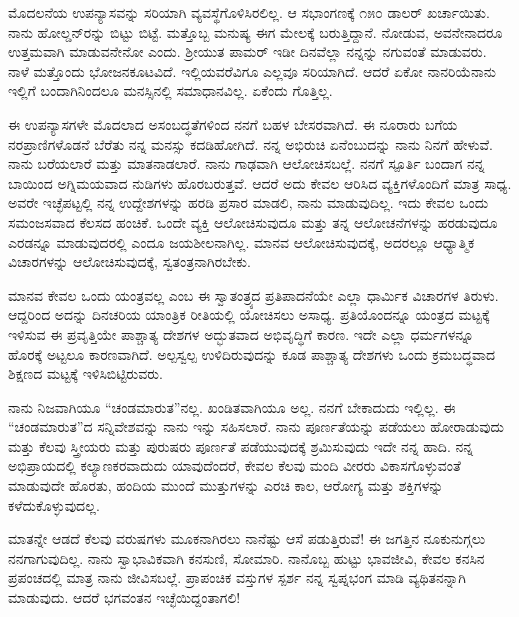ಮೊದಲನೆಯ ಉಪನ್ಯಾಸವನ್ನು ಸರಿಯಾಗಿ ವ್ಯವಸ್ಥೆಗೊಳಿಸಿರಲಿಲ್ಲ. ಆ ಸಭಾಂಗಣಕ್ಕೆ ೧೫೦ ಡಾಲರ್ ಖರ್ಚಾಯಿತು. ನಾನು ಹೋಲ್ಡನ್‌ರನ್ನು ಬಿಟ್ಟು ಬಿಟ್ಟೆ. ಮತ್ತೊಬ್ಬ ಮನುಷ್ಯ ಈಗ ಮೇಲಕ್ಕೆ ಬರುತ್ತಿದ್ದಾನೆ. ನೋಡುವ, ಅವನೇನಾದರೂ ಉತ್ತಮವಾಗಿ ಮಾಡುವನೇನೋ ಎಂದು. ಶ‍್ರೀಯುತ ಪಾಮರ್ ಇಡೀ ದಿನವೆಲ್ಲಾ ನನ್ನನ್ನು ನಗುವಂತೆ ಮಾಡುವರು. ನಾಳೆ ಮತ್ತೊಂದು ಭೋಜನಕೂಟವಿದೆ. ಇಲ್ಲಿಯವರೆವಿಗೂ ಎಲ್ಲವೂ ಸರಿಯಾಗಿದೆ. ಆದರೆ ಏಕೋ ನಾನರಿಯೆ\enginline{-}ನಾನು ಇಲ್ಲಿಗೆ ಬಂದಾಗಿನಿಂದಲೂ ಮನಸ್ಸಿನಲ್ಲಿ ಸಮಾಧಾನವಿಲ್ಲ. ಏಕೆಂದು ಗೊತ್ತಿಲ್ಲ.

ಈ ಉಪನ್ಯಾಸಗಳೇ ಮೊದಲಾದ ಅಸಂಬದ್ಧತೆಗಳಿಂದ ನನಗೆ ಬಹಳ ಬೇಸರವಾಗಿದೆ. ಈ ನೂರಾರು ಬಗೆಯ ನರಪ್ರಾಣಿಗಳೊಡನೆ ಬೆರೆತು ನನ್ನ ಮನಸ್ಸು ಕದಡಿಹೋಗಿದೆ. ನನ್ನ ಅಭಿರುಚಿ ಏನೆಂಬುದನ್ನು ನಾನು ನಿನಗೆ ಹೇಳುವೆ. ನಾನು ಬರೆಯಲಾರೆ ಮತ್ತು ಮಾತನಾಡಲಾರೆ. ನಾನು ಗಾಢವಾಗಿ ಆಲೋಚಿಸಬಲ್ಲೆ. ನನಗೆ ಸ್ಪೂರ್ತಿ ಬಂದಾಗ ನನ್ನ ಬಾಯಿಂದ ಅಗ್ನಿಮಯವಾದ ನುಡಿಗಳು ಹೊರಬರುತ್ತವೆ. ಆದರೆ ಅದು ಕೇವಲ ಆರಿಸಿದ ವ್ಯಕ್ತಿಗಳೊಂದಿಗೆ ಮಾತ್ರ ಸಾಧ್ಯ. ಅವರೇ ಇಚ್ಛೆಪಟ್ಟಲ್ಲಿ ನನ್ನ ಉದ್ದೇಶಗಳನ್ನು ಹರಡಿ ಪ್ರಸಾರ ಮಾಡಲಿ, ನಾನು ಮಾಡುವುದಿಲ್ಲ. ಇದು ಕೇವಲ ಒಂದು ಸಮಂಜಸವಾದ ಕೆಲಸದ ಹಂಚಿಕೆ. ಒಂದೇ ವ್ಯಕ್ತಿ ಆಲೋಚಿಸುವುದೂ ಮತ್ತು ತನ್ನ ಆಲೋಚನೆಗಳನ್ನು ಹರಡುವುದೂ ಎರಡನ್ನೂ ಮಾಡುವುದರಲ್ಲಿ ಎಂದೂ ಜಯಶೀಲನಾಗಿಲ್ಲ. ಮಾನವ ಆಲೋಚಿಸುವುದಕ್ಕೆ, ಅದರಲ್ಲೂ ಆಧ್ಯಾತ್ಮಿಕ ವಿಚಾರಗಳನ್ನು ಆಲೋಚಿಸುವುದಕ್ಕೆ, ಸ್ವತಂತ್ರನಾಗಿರಬೇಕು.

\vspace{0.1cm}

ಮಾನವ ಕೇವಲ ಒಂದು ಯಂತ್ರವಲ್ಲ ಎಂಬ ಈ ಸ್ವಾತಂತ್ರ್ಯದ ಪ್ರತಿಪಾದನೆಯೇ ಎಲ್ಲಾ ಧಾರ್ಮಿಕ ವಿಚಾರಗಳ ತಿರುಳು. ಆದ್ದರಿಂದ ಅದನ್ನು ದಿನಚರಿಯ ಯಾಂತ್ರಿಕ ರೀತಿಯಲ್ಲಿ ಯೋಚಿಸಲು ಅಸಾಧ್ಯ. ಪ್ರತಿಯೊಂದನ್ನೂ ಯಂತ್ರದ ಮಟ್ಟಕ್ಕೆ ಇಳಿಸುವ ಈ ಪ್ರವೃತ್ತಿಯೇ ಪಾಶ್ಚಾತ್ಯ ದೇಶಗಳ ಅದ್ಭುತವಾದ ಅಭಿವೃದ್ಧಿಗೆ ಕಾರಣ. ಇದೇ ಎಲ್ಲಾ ಧರ್ಮಗಳನ್ನೂ ಹೊರಕ್ಕೆ ಅಟ್ಟಲೂ ಕಾರಣವಾಗಿದೆ. ಅಲ್ಪಸ್ವಲ್ಪ ಉಳಿದಿರುವುದನ್ನು ಕೂಡ ಪಾಶ್ಚಾತ್ಯ ದೇಶಗಳು ಒಂದು ಕ್ರಮಬದ್ಧವಾದ ಶಿಕ್ಷಣದ ಮಟ್ಟಕ್ಕೆ ಇಳಿಸಿಬಿಟ್ಟಿರುವರು.

ನಾನು ನಿಜವಾಗಿಯೂ “ಚಂಡಮಾರುತ”ನಲ್ಲ. ಖಂಡಿತವಾಗಿಯೂ ಅಲ್ಲ. ನನಗೆ ಬೇಕಾದುದು ಇಲ್ಲಿಲ್ಲ. ಈ “ಚಂಡಮಾರುತ”ದ ಸನ್ನಿವೇಶವನ್ನು ನಾನು ಇನ್ನು ಸಹಿಸಲಾರೆ. ನಾನು ಪೂರ್ಣತೆಯನ್ನು ಪಡೆಯಲು ಹೋರಾಡುವುದು ಮತ್ತು ಕೆಲವು ಸ್ತ್ರೀಯರು ಮತ್ತು ಪುರುಷರು ಪೂರ್ಣತೆ ಪಡೆಯುವುದಕ್ಕೆ ಶ್ರಮಿಸುವುದು \enginline{-} ಇದೇ ನನ್ನ ಹಾದಿ. ನನ್ನ ಅಭಿಪ್ರಾಯದಲ್ಲಿ ಕಲ್ಯಾಣಕರವಾದುದು ಯಾವುದೆಂದರೆ, ಕೇವಲ ಕೆಲವು ಮಂದಿ ವೀರರು ವಿಕಾಸಗೊಳ್ಳುವಂತೆ ಮಾಡುವುದೇ ಹೊರತು, ಹಂದಿಯ ಮುಂದೆ ಮುತ್ತುಗಳನ್ನು ಎರಚಿ ಕಾಲ, ಆರೋಗ್ಯ ಮತ್ತು ಶಕ್ತಿಗಳನ್ನು ಕಳೆದುಕೊಳ್ಳುವುದಲ್ಲ.

\vspace{0.1cm}
ಮಾತನ್ನೇ ಆಡದೆ ಕೆಲವು ವರುಷಗಳು ಮೂಕನಾಗಿರಲು ನಾನೆಷ್ಟು ಆಸೆ ಪಡುತ್ತಿರುವೆ! ಈ ಜಗತ್ತಿನ ನೂಕುನುಗ್ಗಲು ನನಗಾಗುವುದಿಲ್ಲ. ನಾನು ಸ್ವಾಭಾವಿಕವಾಗಿ ಕನಸುಣಿ, ಸೋಮಾರಿ. ನಾನೊಬ್ಬ ಹುಟ್ಟು ಭಾವಜೀವಿ, ಕೇವಲ ಕನಸಿನ ಪ್ರಪಂಚದಲ್ಲಿ ಮಾತ್ರ ನಾನು ಜೀವಿಸಬಲ್ಲೆ. ಪ್ರಾಪಂಚಿಕ ವಸ್ತುಗಳ ಸ್ಪರ್ಶ ನನ್ನ ಸ್ವಪ್ನಭಂಗ ಮಾಡಿ ವ್ಯಥಿತನನ್ನಾಗಿ ಮಾಡುವುದು. ಆದರೆ ಭಗವಂತನ ಇಚ್ಛೆಯಿದ್ದಂತಾಗಲಿ!

\vspace{0.1cm}

